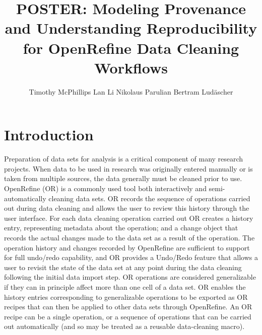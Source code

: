 \documentclass[sigconf,screen,nonacm]{acmart}
\begin{document}
\title[Reproducible Data Cleaning]{POSTER: Modeling
  Provenance and Understanding Reproducibility for OpenRefine Data
  Cleaning Workflows}

\author{Timothy McPhillips \qquad Lan Li \qquad Nikolaus Parulian \qquad Bertram Lud\"ascher}
 


\maketitle

\section{Introduction}

Preparation of data sets for analysis is a critical component of many research projects.
When data to be used in research was originally entered manually or is taken from multiple sources, the data generally must be cleaned prior to use.
OpenRefine (OR) is a commonly used tool both interactively and semi-automatically cleaning data sets.
OR records the sequence of operations carried out during data cleaning and allows the user to review this history through the user interface.
For each data cleaning operation carried out OR creates a history entry, representing metadata about the operation; and a change object that records the actual changes made to the data set as a result of the operation.
The operation history and changes recorded by OpenRefine are sufficient to support for full undo/redo capability, and OR provides a Undo/Redo feature that allows a user to revisit the state of the data set at any point during the data cleaning following the initial data import step.
OR operations are considered generalizable if they can in principle affect more than one cell of a data set.
OR enables the history entries corresponding to generalizable operations to be exported as  OR recipes that can then be applied to other data sets through OpenRefine.
An OR recipe can be a single operation, or a sequence of operations that can be carried out automatically (and so may be treated as a reusable data-cleaning macro).
\cite{verborgh_using_2013}
\end{document}
